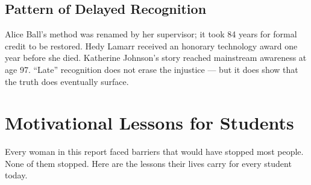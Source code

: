 \documentclass[12pt,a4paper]{article}
\begin{document}
\subsection*{Pattern of Delayed Recognition}
Alice Ball's method was renamed by her supervisor; it took 84 years for formal credit to be restored. Hedy Lamarr received an honorary technology award one year before she died. Katherine Johnson's story reached mainstream awareness at age 97. ``Late'' recognition does not erase the injustice — but it does show that the truth does eventually surface.

\newpage

\section*{Motivational Lessons for Students}

\begin{tcolorbox}[motivationbox, title={What These Stories Teach Us}]

Every woman in this report faced barriers that would have stopped most people. None of them stopped. Here are the lessons their lives carry for every student today.

\end{tcolorbox}

\vspace{10pt}
\end{document}
